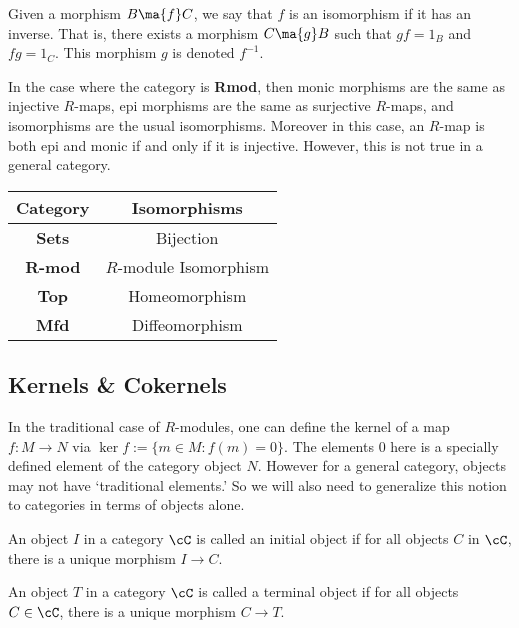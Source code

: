 \begin{dfn}[Isomorphism]
Given a morphism $B \ma{f} C$, we say that $f$ is an isomorphism if it has an inverse. That is, there exists a morphism $C \ma{g} B$ such that $gf=1_B$ and $fg=1_C$. This morphism $g$ is denoted $f^{-1}$. 
\end{dfn}


In the case where the category is \textbf{Rmod}, then monic morphisms are the same as injective $R$-maps, epi morphisms are the same as surjective $R$-maps, and isomorphisms are the usual isomorphisms. Moreover in this case, an $R$-map is both epi and monic if and only if it is injective. However, this is not true in a general category. 


\begin{ex}
	\begin{center}
	\begin{tabular}{cc} \hline
	Category & Isomorphisms \\ \hline \hline 
	\textbf{Sets} & Bijection \\
	\textbf{R-mod} & $R$-module Isomorphism \\
	\textbf{Top} & Homeomorphism \\
	\textbf{Mfd} & Diffeomorphism 
	\end{tabular}
	\end{center} \xqed
\end{ex}



\subsection{Kernels \& Cokernels}



In the traditional case of $R$-modules, one can define the kernel of a map $f: M \to N$ via $\ker f:= \{ m \in M \colon f(m)=0\}$. The elements 0 here is a specially defined element of the category object $N$. However for a general category, objects may not have `traditional elements.' So we will also need to generalize this notion to categories in terms of objects alone.


\begin{dfn}
An object $I$ in a category $\cC$ is called an initial object if for all objects $C$ in $\cC$, there is a unique morphism $I \to C$.
\end{dfn}


\begin{dfn}
An object $T$ in a category $\cC$ is called a terminal object if for all objects $C \in \cC$, there is a unique morphism $C \to T$.
\end{dfn}


